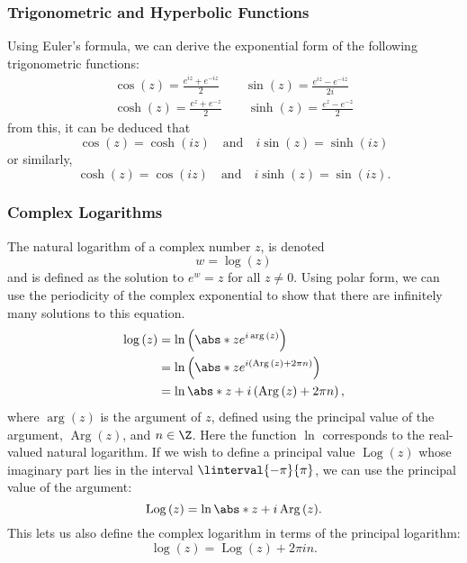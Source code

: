 \documentclass{article}
\DeclareMathOperator{\Arg}{Arg}
\DeclareMathOperator{\Log}{Log}
\begin{document}
\subsubsection{Trigonometric and Hyperbolic Functions}
Using Euler's formula, we can derive the exponential form of the
following trigonometric functions:
\begin{align*}
    \cos{\left( z \right)} = \frac{e^{i z} + e^{-i z}}{2} \qquad \sin{\left( z \right)} = \frac{e^{i z} - e^{-i z}}{2i} \\
    \cosh{\left( z \right)} = \frac{e^{z} + e^{-z}}{2} \qquad \sinh{\left( z \right)} = \frac{e^{z} - e^{-z}}{2}
\end{align*}
from this, it can be deduced that
\begin{equation*}
    \cos{\left( z \right)} = \cosh{\left( i z \right)} \quad \text{and} \quad i \sin{\left( z \right)} = \sinh{\left( i z \right)}
\end{equation*}
or similarly,
\begin{equation*}
    \cosh{\left( z \right)} = \cos{\left( i z \right)} \quad \text{and} \quad i \sinh{\left( z \right)} = \sin{\left( i z \right)}.
\end{equation*}
\subsubsection{Complex Logarithms}
The natural logarithm of a complex number \(z\), is denoted
\begin{equation*}
    w = \log{\left( z \right)}
\end{equation*}
and is defined as the solution to \(e^w = z\) for all \(z \neq 0\).
Using polar form, we can use the periodicity of the complex exponential
to show that there are infinitely many solutions to this equation.
\begin{align*}
    \log{\left( z \right)} & = \ln{\left( \abs*{z} e^{i \arg{\left( z \right)}} \right)}                        \\
                           & = \ln{\left( \abs*{z} e^{i \left( \Arg{\left( z \right)} + 2\pi n\right)} \right)} \\
                           & = \ln{\abs*{z}} + i \left( \Arg{\left( z \right)} + 2 \pi n \right),
\end{align*}
where \(\arg{\left( z \right)}\) is the argument of \(z\), defined using
the principal value of the argument, \(\Arg{\left( z \right)}\), and
\(n \in \Z\). Here the function \(\ln\) corresponds to the real-valued
natural logarithm. If we wish to define a principal value \(\Log{\left( z
    \right)}\) whose imaginary part lies in the interval
\(\linterval{-\pi}{\pi}\), we can use the principal value of the
argument:
\begin{equation*}
    \Log{\left( z \right)} = \ln{\abs*{z}} + i \Arg{\left( z \right)}.
\end{equation*}
This lets us also define the complex logarithm in terms of the principal
logarithm:
\begin{equation*}
    \log{\left( z \right)} = \Log{\left( z \right)} + 2 \pi i n.
\end{equation*}
\end{document}
